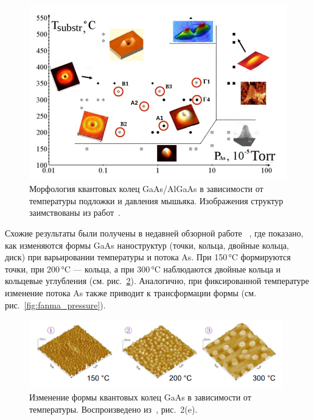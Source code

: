 \documentclass[14pt,oneside]{extarticle}
\begin{document}
\begin{figure}[H]
    \begin{center}
        \includegraphics[width=14cm]{images/morphology_map.png}
        \caption{\label{fig:morph_map}
            Морфология квантовых колец GaAs/AlGaAs в зависимости от температуры подложки и давления мышьяка. Изображения структур заимствованы из работ~\cite{mano2005nano, koguchi2005growth, vasilevskiy2013}.}
    \end{center}
\end{figure}

Схожие результаты были получены в недавней обзорной работе ~\cite{fan2023}, где показано, как изменяются формы GaAs наноструктур (точки, кольца, двойные кольца, диск) при варьировании температуры и потока As. При 150 °C формируются точки, при 200 °C — кольца, а при 300 °C наблюдаются двойные кольца и кольцевые углубления (см. рис.~\ref{fig:fanma_temp}). Аналогично, при фиксированной температуре изменение потока As также приводит к трансформации формы (см. рис.~\ref{fig:fanma_pressure}).

\begin{figure}[H]
    \begin{center}
        \includegraphics[width=11cm]{images/fanma_fig2e_left.png}
        \caption{\label{fig:fanma_temp}
            Изменение формы квантовых колец GaAs в зависимости от температуры. Воспроизведено из~\cite{fan2023}, рис.~2(e).}
    \end{center}
\end{figure}
\end{document}
